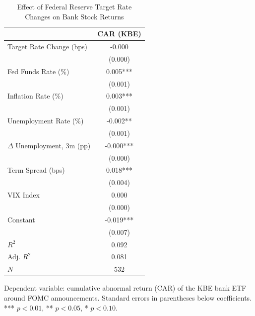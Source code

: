 \begin{table}[t]
\centering
\begin{threeparttable}
\caption{Effect of Federal Reserve Target Rate Changes on Bank Stock Returns}
\label{tab:main}
\begin{tabular}{lc}
\toprule
 & CAR (KBE) \\
\midrule
Target Rate Change (bps) & -0.000 \\
 & (0.000) \\
Fed Funds Rate (\%) & 0.005*** \\
 & (0.001) \\
Inflation Rate (\%) & 0.003*** \\
 & (0.001) \\
Unemployment Rate (\%) & -0.002** \\
 & (0.001) \\
$\Delta$ Unemployment, 3m (pp) & -0.000*** \\
 & (0.000) \\
Term Spread (bps) & 0.018*** \\
 & (0.004) \\
VIX Index & 0.000 \\
 & (0.000) \\
Constant & -0.019*** \\
 & (0.007) \\
$R^2$ & 0.092 \\
Adj. $R^2$ & 0.081 \\
$N$ & 532 \\
\bottomrule
\end{tabular}
\begin{tablenotes}[flushleft]
\footnotesize
\item Dependent variable: cumulative abnormal return (CAR) of the KBE bank ETF around FOMC announcements. Standard errors in parentheses below coefficients. *** $p<0.01$, ** $p<0.05$, * $p<0.10$.
\end{tablenotes}
\end{threeparttable}
\end{table}
